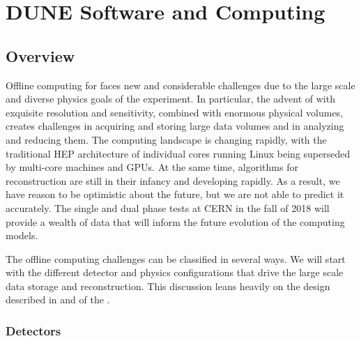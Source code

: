 %
\chapter{DUNE Software and Computing }


\section{Overview}

Offline computing for   faces new and considerable challenges due to the large scale and diverse physics goals of the experiment.  In particular, the advent of   with exquisite resolution and sensitivity, combined with enormous physical volumes, creates challenges in acquiring and storing large data volumes and in analyzing and reducing them.  The computing landscape is changing rapidly, with the traditional HEP architecture of individual cores running Linux being superseded by multi-core machines and GPUs. At the same time, algorithms for  reconstruction are still in their infancy and developing rapidly.  As a result, we have reason to be optimistic about the future, but we are not able to predict it accurately.  The  single and dual phase tests at CERN in the fall of 2018 will provide a wealth of data that will inform the future evolution of  the  computing models.

The   offline computing challenges can be classified in several ways.  We will start with the different detector and physics configurations that drive the large scale data storage and reconstruction. 
This discussion leans heavily on the  design described in \voltitlespfd and \voltitledpfd  of the  . 

\subsection{Detectors}



